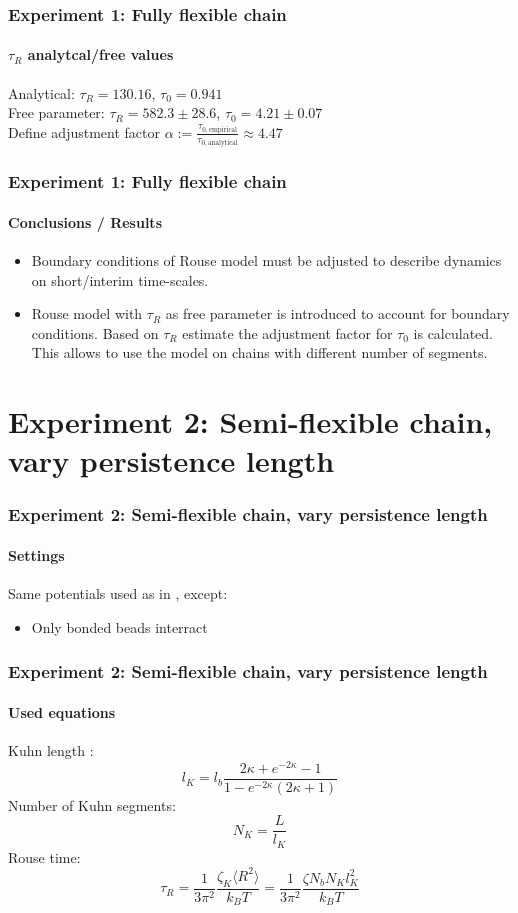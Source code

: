 \documentclass[handout]{beamer}
\newcommand{\mean}[1]{\langle #1 \rangle}
\begin{document}
\begin{frame}
    \frametitle{Experiment 1: Fully flexible chain}
    \framesubtitle{$\tau_R$ analytcal/free values}

    Analytical: $\tau_R=130.16$, $\tau_0=0.941$
    \\
    Free parameter: $\tau_R=582.3 \pm 28.6$, $\tau_0=4.21 \pm 0.07$
    \\
    \vspace{1cm}
    Define adjustment factor
    $ \alpha := \frac{\tau_{0, \textrm{empirical}}}{\tau_{0, \textrm{analytical}}} \approx 4.47$
\end{frame}

\begin{frame}
    \frametitle{Experiment 1: Fully flexible chain}
    \framesubtitle{Conclusions / Results}
    \begin{itemize}
        \item Boundary conditions of Rouse model must be adjusted to describe dynamics on 
        short/interim time-scales.
        \item Rouse model with $\tau_R$ as free parameter is introduced to account for boundary
        conditions. Based on $\tau_R$ estimate the adjustment factor for $\tau_0$ is calculated.
        This allows to use the model on chains with different number of segments.

    \end{itemize}
\end{frame}

\section{Experiment 2: Semi-flexible chain, vary persistence length}

\begin{frame}
    \frametitle{Experiment 2: Semi-flexible chain, vary persistence length}
    \framesubtitle{Settings}
    Same potentials used as in \cite[Section 2.1]{svaneborg_2020}, except:
    \begin{itemize}
        \item Only bonded beads interract
    \end{itemize}
\end{frame}

\begin{frame}
    \frametitle{Experiment 2: Semi-flexible chain, vary persistence length}
    \framesubtitle{Used equations}

    Kuhn length \cite{svaneborg_2020}:
    \begin{equation}
        l_K = l_b \frac{2\kappa + e^{-2 \kappa} - 1}{1-e^{-2\kappa}(2 \kappa + 1)}
    \end{equation}
    Number of Kuhn segments:
    \begin{equation} 
        N_K = \frac{L}{l_K}
    \end{equation}
    Rouse time:
    \begin{equation} \label{eq:tau_R_kuhn}
        \tau_R = \frac{1}{3 \pi^2} \frac{\zeta_{K} \mean{R^2}}{k_B T} = \frac{1}{3 \pi^2} \frac{\zeta N_b N_K l_K^2}{k_B T}
    \end{equation}
\end{frame}
\end{document}
